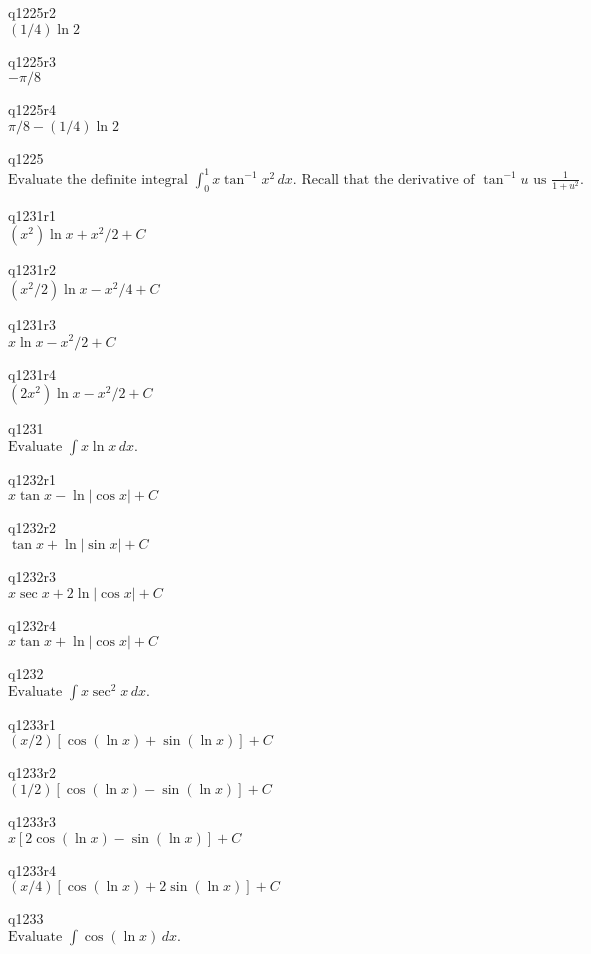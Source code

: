 q1225r2\\
\(\displaystyle (1/4) \ln 2 \)

q1225r3\\
\(\displaystyle -\pi/8 \)

q1225r4\\
\(\displaystyle \pi/8 - (1/4) \ln 2 \)

q1225\\
\(\displaystyle \text{Evaluate the definite integral } \int_0^1 x \tan^{-1} x^2 \, dx. \text{ Recall that the derivative of } \tan^{-1} u \text{ us } \frac{1}{1+u^2}. \)

q1231r1\\
\(\displaystyle (x^2) \ln x + x^2/2 + C \)

q1231r2\\
\(\displaystyle (x^2 / 2) \ln x - x^2 /4 + C \)

q1231r3\\
\(\displaystyle x \ln x - x^2/2 + C \)

q1231r4\\
\(\displaystyle (2x^2) \ln x - x^2/2 + C \)

q1231\\
\(\displaystyle \text{Evaluate } \int x\ln x \, dx. \)

q1232r1\\
\(\displaystyle x \tan x - \ln |\cos x| + C \)

q1232r2\\
\(\displaystyle \tan x + \ln|\sin x| + C \)

q1232r3\\
\(\displaystyle x\sec x + 2\ln|\cos x| + C \)

q1232r4\\
\(\displaystyle x \tan x + \ln|\cos x| + C \)

q1232\\
\(\displaystyle \text{Evaluate } \int x \sec^2 x \, dx. \)

q1233r1\\
\(\displaystyle (x/2)[\cos(\ln x) + \sin(\ln x)] + C \)

q1233r2\\
\(\displaystyle (1/2)[\cos(\ln x) - \sin(\ln x)] + C \)

q1233r3\\
\(\displaystyle x[2 \cos (\ln x) - \sin(\ln x)] + C \)

q1233r4\\
\(\displaystyle (x/4)[\cos(\ln x) + 2\sin(\ln x)] + C \)

q1233\\
\(\displaystyle \text{Evaluate } \int \cos(\ln x)\,dx. \)

